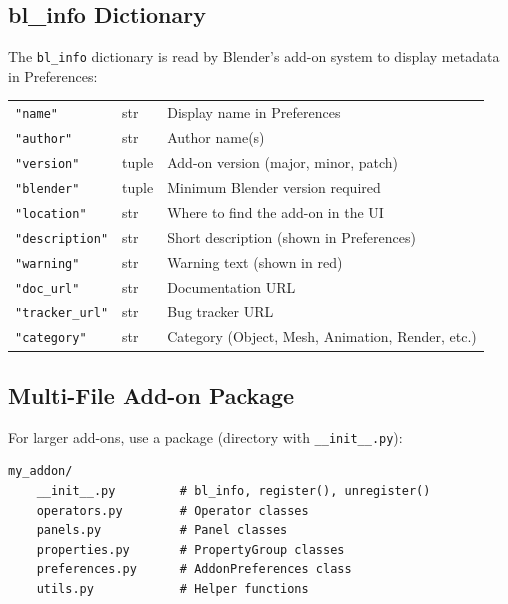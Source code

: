\subsection{bl\_info Dictionary}

The \texttt{bl\_info} dictionary is read by Blender's add-on system to display metadata in Preferences:

\begin{center}
\begin{tabularx}{\textwidth}{L{3cm}L{1.5cm}X}
\toprule
{}
 &  &  \\
\midrule
\texttt{"name"} & str & Display name in Preferences \\
\texttt{"author"} & str & Author name(s) \\
\texttt{"version"} & tuple & Add-on version (major, minor, patch) \\
\texttt{"blender"} & tuple & Minimum Blender version required \\
\texttt{"location"} & str & Where to find the add-on in the UI \\
\texttt{"description"} & str & Short description (shown in Preferences) \\
\texttt{"warning"} & str & Warning text (shown in red) \\
\texttt{"doc\_url"} & str & Documentation URL \\
\texttt{"tracker\_url"} & str & Bug tracker URL \\
\texttt{"category"} & str & Category (Object, Mesh, Animation, Render, etc.) \\
\bottomrule
\end{tabularx}
\end{center}

\subsection{Multi-File Add-on Package}

For larger add-ons, use a package (directory with \texttt{\_\_init\_\_.py}):

\begin{codebox}
\begin{verbatim}
my_addon/
    __init__.py         # bl_info, register(), unregister()
    operators.py        # Operator classes
    panels.py           # Panel classes
    properties.py       # PropertyGroup classes
    preferences.py      # AddonPreferences class
    utils.py            # Helper functions
\end{verbatim}
\end{codebox}

